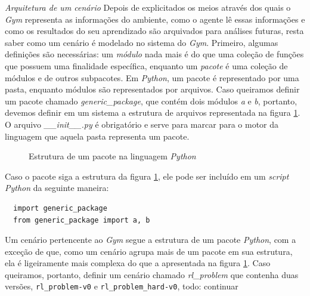 \documentclass[cic,tc]{iiufrgs}
\begin{document}
\textit{Arquitetura de um cenário}
Depois de explicitados os meios através dos quais o \textit{Gym} representa as
informações do ambiente, como o agente lê essas informações e como os resultados
do seu aprendizado são arquivados para análises futuras, resta saber como um
cenário é modelado no sistema do \textit{Gym}. Primeiro, algumas definições são
necessárias: um \textit{módulo} nada mais é do que uma coleção de funções que
possuem uma finalidade específica, enquanto um \textit{pacote} é uma coleção de
módulos e de outros subpacotes. Em \textit{Python}, um pacote é representado por
uma pasta, enquanto módulos são representados por arquivos. Caso queiramos
definir um pacote chamado \textit{generic\_package}, que contém dois módulos
\textit{a} e \textit{b}, portanto, devemos definir em um sistema a estrutura de
arquivos representada na figura \ref{fig:python_package}. O arquivo
\textit{\_\_init\_\_.py} é obrigatório e serve para marcar para o motor da
linguagem que aquela pasta representa um pacote.

\begin{figure}[h]
  \label{fig:python_package}
  \caption{Estrutura de um pacote na linguagem \textit{Python}}
  \vspace{2mm}
  \begin{center}
\end{center}
\end{figure}

Caso o pacote siga a estrutura da figura \ref{fig:python_package}, ele pode ser
incluído em um \textit{script Python} da seguinte maneira:

\begin{verbatim}
  import generic_package
  from generic_package import a, b
\end{verbatim}

Um cenário pertencente ao \textit{Gym} segue a estrutura de um pacote
\textit{Python}, com a exceção de que, como um cenário agrupa mais de um pacote
em sua estrutura, ela é ligeiramente mais complexa do que a apresentada na
figura \ref{fig:python_package}. Caso queiramos, portanto, definir um cenário
chamado \textit{rl\_problem} que contenha duas versões, \texttt{rl\_problem-v0}
e \texttt{rl\_problem\_hard-v0}, todo: continuar
\end{document}
